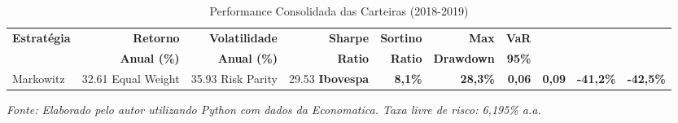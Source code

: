 \begin{table}[H]
\centering
\caption{Performance Consolidada das Carteiras (2018-2019)}
\begin{tabular}{|l|r|r|r|r|r|r|}
\hline
\textbf{Estratégia} & \textbf{Retorno} & \textbf{Volatilidade} & \textbf{Sharpe} & \textbf{Sortino} & \textbf{Max} & \textbf{VaR} \\
& \textbf{Anual (\%)} & \textbf{Anual (\%)} & \textbf{Ratio} & \textbf{Ratio} & \textbf{Drawdown} & \textbf{95\%} \\
\hline
Markowitz & 32.61%
\hline
Equal Weight & 35.93%
\hline
Risk Parity & 29.53%
\hline
\textbf{Ibovespa} & \textbf{8,1\%} & \textbf{28,3\%} & \textbf{0,06} & \textbf{0,09} & \textbf{-41,2\%} & \textbf{-42,5\%} \\
\hline
\end{tabular}

\textit{Fonte: Elaborado pelo autor utilizando Python com dados da Economatica. Taxa livre de risco: 6,195\% a.a.}
\label{tab:portfolio_performance}
\end{table}
